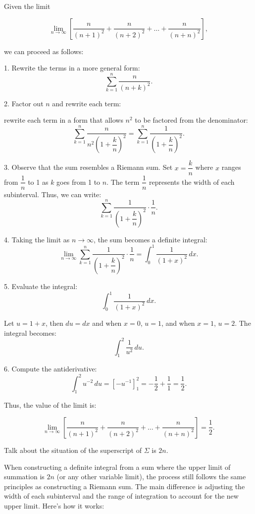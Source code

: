 \documentclass[a4paper,12pt]{book}
\begin{document}
Given the limit

\[
\lim_{n\to \infty} \left[ \dfrac{n}{(n+1)^2} + \dfrac{n}{(n+2)^2}+ \dots + \dfrac{n}{(n+n)^2} \right],
\]

we can proceed as follows:

1. Rewrite the terms in a more general form:
   \[
   \sum_{k=1}^n \dfrac{n}{(n+k)^2}.
   \]

2. Factor out \(n\) and rewrite each term:

   rewrite each term in a form that allows \( n^2 \) to be factored from the denominator:
   \[
   \sum_{k=1}^n \dfrac{n}{n^2 \left(1 + \dfrac{k}{n}\right)^2}=\sum_{k=1}^n \dfrac{1}{\left(1 + \dfrac{k}{n}\right)^2}.
   \]
   
   

3. Observe that the sum resembles a Riemann sum. Set \(x = \dfrac{k}{n}\) where \(x\) ranges from \(\dfrac{1}{n}\) to 1 as \(k\) goes from 1 to \(n\). The term \(\dfrac{1}{n}\) represents the width of each subinterval. Thus, we can write:
   \[
   \sum_{k=1}^n \dfrac{1}{\left(1 + \dfrac{k}{n}\right)^2} \cdot \dfrac{1}{n}.
   \]

4. Taking the limit as \(n \to \infty\), the sum becomes a definite integral:
   \[
   \lim_{n \to \infty} \sum_{k=1}^n \dfrac{1}{\left(1 + \dfrac{k}{n}\right)^2} \cdot \dfrac{1}{n} = \int_0^1 \dfrac{1}{(1 + x)^2} \, dx.
   \]

5. Evaluate the integral:
   \[
   \int_0^1 \dfrac{1}{(1 + x)^2} \, dx.
   \]

   Let \(u = 1 + x\), then \(du = dx\) and when \(x = 0\), \(u = 1\), and when \(x = 1\), \(u = 2\). The integral becomes:
   \[
   \int_1^2 \dfrac{1}{u^2} \, du.
   \]

6. Compute the antiderivative:
   \[
   \int_1^2 u^{-2} \, du = \left[ -u^{-1} \right]_1^2 = -\dfrac{1}{2} + \dfrac{1}{1} = \dfrac{1}{2}.
   \]

Thus, the value of the limit is:

\[
\lim_{n\to \infty} \left[ \dfrac{n}{(n+1)^2} + \dfrac{n}{(n+2)^2}+ \dots + \dfrac{n}{(n+n)^2} \right] = \dfrac{1}{2}.
\]

\begin{bluebox}
Talk about the situation of the superscript of \(\Sigma\) is \(2n\).
\end{bluebox}

When constructing a definite integral from a sum where the upper limit of summation is \(2n\) (or any other variable limit), the process still follows the same principles as constructing a Riemann sum. The main difference is adjusting the width of each subinterval and the range of integration to account for the new upper limit. Here’s how it works:
\end{document}
